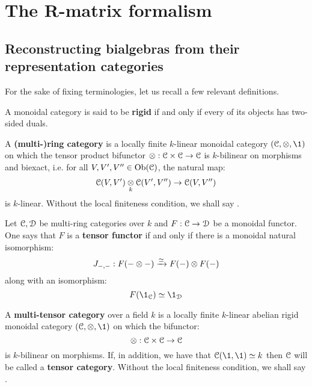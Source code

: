 \section{The R-matrix formalism}
    \subsection{Reconstructing bialgebras from their representation categories}
        For the sake of fixing terminologies, let us recall a few relevant definitions.
        \begin{definition} \label{def: rigid_monoidal_categories}
            A monoidal category is said to be \textbf{rigid} if and only if every of its objects has two-sided duals. 
        \end{definition}
        \begin{definition} \label{def: ring_categories}
            \cite[Definition 4.1.1]{EGNO_tensor_categories} A \textbf{(multi-)ring category} is a locally finite $k$-linear monoidal category $(\C, \tensor, \1)$ on which the tensor product bifunctor $\tensor: \C \x \C \to \C$ is $k$-bilinear on morphisms and biexact, i.e. for all $V, V', V'' \in \mathrm{Ob}(\mathcal{C})$, the natural map:
                $$\C(V, V') \tensor_k \C(V', V'') \to \C(V, V'')$$
            is $k$-linear. Without the local finiteness condition, we shall say .
        \end{definition}
        \begin{definition} \label{def: tensor_functors}
            Let $\mathcal{C}, \mathcal{D}$ be multi-ring categories over $k$ and $F: \mathcal{C} \to \mathcal{D}$ be a monoidal functor. One says that $F$ is a \textbf{tensor functor} if and only if there is a monoidal natural isomorphism:
                $$J_{-, -}: F(- \tensor -) \xrightarrow[]{\cong} F(-) \tensor F(-)$$
            along with an isomorphism:
                $$F(\1_{\C}) \cong \1_{\D}$$
        \end{definition}
        \begin{definition} \label{def: tensor_categories}
            \cite[Definition 4.1.1]{EGNO_tensor_categories} A  \textbf{multi-tensor category} over a field $k$ is a locally finite $k$-linear abelian rigid monoidal category $(\C, \tensor, \1)$ on which the bifunctor:
                $$\tensor: \C \x \C \to \C$$
            is $k$-bilinear on morphisms. If, in addition, we have that $\C(\1, \1) \cong k$ then $\mathcal{C}$ will be called a \textbf{tensor category}. Without the local finiteness condition, we shall say .
        \end{definition}
